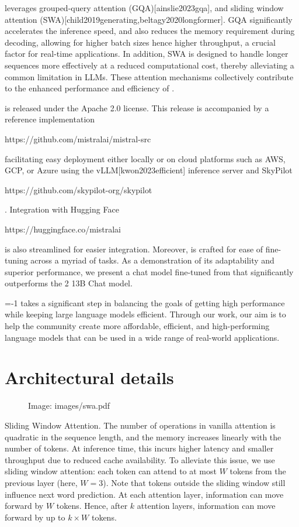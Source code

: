 \documentclass[11pt,a4paper]{article}
\begin{document}
leverages grouped-query attention (GQA)[ainslie2023gqa], and sliding window attention (SWA)[child2019generating,beltagy2020longformer]. GQA significantly accelerates the inference speed, and also reduces the memory requirement during decoding, allowing for higher batch sizes hence higher throughput, a crucial factor for real-time applications.
In addition, SWA is designed to handle longer sequences more effectively at a reduced computational cost, thereby alleviating a common limitation in LLMs. These attention mechanisms collectively contribute to the enhanced performance and efficiency of .

is released under the Apache 2.0 license.
This release is accompanied by a reference implementation

https://github.com/mistralai/mistral-src

facilitating easy deployment either locally or on cloud platforms such as AWS, GCP, or Azure using the vLLM[kwon2023efficient] inference server and SkyPilot

https://github.com/skypilot-org/skypilot

.
Integration with Hugging Face

https://huggingface.co/mistralai

is also streamlined for easier integration.
Moreover, is crafted for ease of fine-tuning across a myriad of tasks.
As a demonstration of its adaptability and superior performance, we present a chat model fine-tuned from that significantly outperforms the 2 13B  Chat model.

=-1 takes a significant step in balancing the goals of getting high performance while keeping large language models efficient.
Through our work, our aim is to help the community create more affordable, efficient, and high-performing language models that can be used in a wide range of real-world applications.

\section{Architectural details}

\begin{figure}[h]
\caption{Image: images/swa.pdf}
\end{figure}

Sliding Window Attention. The number of operations in vanilla attention is quadratic in the sequence length, and the memory increases linearly with the number of tokens. At inference time, this incurs higher latency and smaller throughput due to reduced cache availability. To alleviate this issue, we use sliding window attention: each token can attend to at most $W$ tokens from the previous layer (here, $W=3$). Note that tokens outside the sliding window still influence next word prediction. At each attention layer, information can move forward by $W$ tokens. Hence, after $k$ attention layers, information can move forward by up to $k \times W$ tokens.
\end{document}
